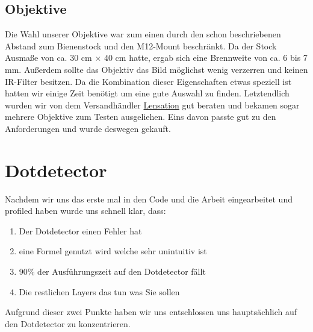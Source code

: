 \documentclass[11pt,a4paper]{article}
\begin{document}
\subsection{Objektive}

Die Wahl unserer Objektive war zum einen durch den schon beschriebenen Abstand zum Bienenstock und den M12-Mount beschränkt.
Da der Stock Ausmaße von ca. 30 cm $\times$ 40 cm hatte, ergab sich eine Brennweite von ca. 6 bis 7 mm.
Außerdem sollte das Objektiv das Bild möglichst wenig verzerren und keinen IR-Filter besitzen.
Da die Kombination dieser Eigenschaften etwas speziell ist hatten wir einige Zeit benötigt um eine gute Auswahl zu finden.
Letztendlich wurden wir von dem Versandhändler \href{http://www.lensation.de/}{Lensation} gut beraten und bekamen sogar mehrere Objektive
zum Testen ausgeliehen.
Eins davon passte gut zu den Anforderungen und wurde deswegen gekauft.

\section{Dotdetector}
Nachdem wir uns das erste mal in den Code und die Arbeit eingearbeitet und profiled haben wurde uns schnell klar, dass:
\begin{enumerate}
\item  Der Dotdetector einen Fehler hat
\item eine Formel genutzt wird welche sehr unintuitiv ist 
\item 90\% der Ausführungszeit auf den Dotdetector fällt
\item Die restlichen Layers das tun was Sie sollen\\
\end{enumerate}
Aufgrund dieser zwei Punkte haben wir uns entschlossen uns hauptsächlich auf den Dotdetector zu konzentrieren.
\end{document}
